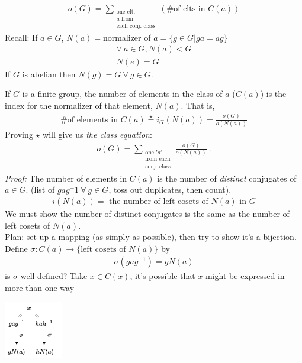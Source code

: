 \begin{align}
    o(G) = \sum_{\substack{\text{one elt. }\\a \text{ from} \\ \text{each conj. class}}}(\text{\# of elts in }C(a)) \nonumber
\end{align}
Recall: If $a\in G$, $N(a)=$normalizer of $a = \{g\in G | ga=ag\}$
\begin{align}
    \forall \ a \in G, N(a)<G \nonumber \\
    N(e) = G \nonumber
\end{align}
If $G$ is abelian then $N(g) = G \ \forall \ g\in G$.
\newpage
\begin{theorem}
If $G$ is a finite group, the number of elements in the class of $a$ ($C(a)$) is the index for the normalizer of that element, $N(a)$. That is,
\begin{align}
    \text{\# of elements in }C(a) \overset{\star}{=} i_G(N(a))= \frac{o(G)}{o(N(a))} \nonumber
\end{align}
Proving $\star$ will give us \textit{the class equation}:
\begin{align}
    o(G) = \sum_{\substack{\text{one  '}a'  \\\text{from each} \\ \text{conj. class}}}\frac{o(G)}{o(N(a))} \ .\nonumber
\end{align}
\textit{Proof:} The number of elements in $C(a)$ is the number of \textit{distinct} conjugates of $a\in G$. (list of $gag^-1 \ \forall \ g\in G$, toss out duplicates, then count).
\begin{align}
    i(N(a))= \text{ the number of left cosets of }N(a) \text{ in }G
\end{align}
We must show the number of distinct conjugates is the same as the number of left cosets of $N(a)$. \steezybreak\\
Plan: set up a mapping (as simply as possible), then try to show it's a bijection. \steezybreak\\
Define $\sigma:C(a)\rightarrow \{\text{left cosets of }N(a)\}$ by 
\begin{align}
    \sigma(gag^{-1})=gN(a)
\end{align}
is $\sigma$ well-defined? Take $x\in C(x)$, it's possible that $x$ might be expressed in more than one way
\begin{center}
    \includegraphics[width=0.19\textwidth]{Figures/sigma_well_def.png}

\end{center}
\end{theorem}

